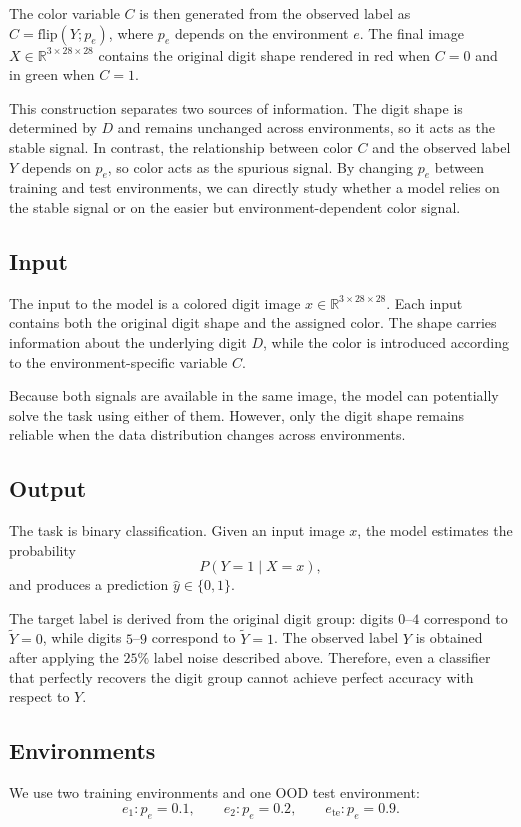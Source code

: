 \documentclass[12pt,a4paper]{article}
\begin{document}
The color variable $C$ is then generated from the observed label as
$C = \mathrm{flip}(Y;p_e)$, where $p_e$ depends on the environment $e$.
The final image $X \in \mathbb{R}^{3 \times 28 \times 28}$ contains the original
digit shape rendered in red when $C=0$ and in green when $C=1$.

This construction separates two sources of information. The digit shape is determined
by $D$ and remains unchanged across environments, so it acts as the stable signal.
In contrast, the relationship between color $C$ and the observed label $Y$ depends on
$p_e$, so color acts as the spurious signal. By changing $p_e$ between training and
test environments, we can directly study whether a model relies on the stable signal
or on the easier but environment-dependent color signal.

\subsection{Input}
The input to the model is a colored digit image
$x \in \mathbb{R}^{3 \times 28 \times 28}$.
Each input contains both the original digit shape and the assigned color.
The shape carries information about the underlying digit $D$, while the color is
introduced according to the environment-specific variable $C$.

Because both signals are available in the same image, the model can potentially solve
the task using either of them. However, only the digit shape remains reliable when the
data distribution changes across environments.

\subsection{Output}
The task is binary classification. Given an input image $x$, the model estimates
the probability
\[
P(Y=1 \mid X=x),
\]
and produces a prediction $\hat{y} \in \{0,1\}$.

The target label is derived from the original digit group:
digits $0$--$4$ correspond to $\tilde{Y}=0$, while digits $5$--$9$ correspond to
$\tilde{Y}=1$. The observed label $Y$ is obtained after applying the $25\%$ label
noise described above. Therefore, even a classifier that perfectly recovers the
digit group cannot achieve perfect accuracy with respect to $Y$.

\subsection{Environments}
We use two training environments and one OOD test environment:
\[
e_1: p_e=0.1, \qquad
e_2: p_e=0.2, \qquad
e_{\mathrm{te}}: p_e=0.9.
\]
\end{document}
